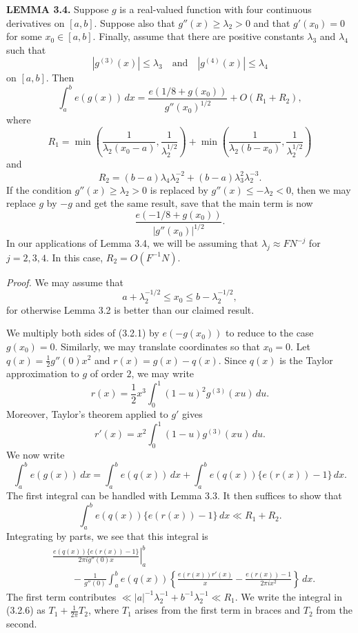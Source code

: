 \documentclass[10pt]{article}
\begin{document}
\medskip
\noindent\textbf{LEMMA 3.4.}
Suppose $g$ is a real-valued function with four continuous derivatives on
$[a,b]$. Suppose also that $g''(x)\geq\lambda_2>0$ and that $g'(x_0)=0$ for
some $x_0\in[a,b]$. Finally, assume that there are positive constants
$\lambda_3$ and $\lambda_4$ such that
\[
 |g^{(3)}(x)|\leq\lambda_3
 \quad\text{and}\quad
 |g^{(4)}(x)|\leq\lambda_4
\]
on $[a,b]$. Then
\begin{equation*}
 \int_a^b e(g(x))\,dx
 =\frac{e(1/8+g(x_0))}{g''(x_0)^{1/2}}+O(R_1+R_2), \tag{3.2.1}
\end{equation*}
where
\[
 R_1=
 \min\left(\frac{1}{\lambda_2(x_0-a)},\frac1{\lambda_2^{1/2}}\right)
 +\min\left(\frac{1}{\lambda_2(b-x_0)},\frac1{\lambda_2^{1/2}}\right)
\]
and
\[
 R_2=(b-a)\lambda_4\lambda_2^{-2}
     +(b-a)\lambda_3^2\lambda_2^{-3}.
\]
If the condition $g''(x)\geq\lambda_2>0$ is replaced by
$g''(x)\leq-\lambda_2<0$, then we may replace $g$ by $-g$ and get the same
result, save that the main term is now
\[
 \frac{e(-1/8+g(x_0))}{|g''(x_0)|^{1/2}}.
\]
In our applications of Lemma 3.4, we will be assuming that
$\lambda_j\approx FN^{-j}$ for $j=2,3,4$. In this case, $R_2=O(F^{-1}N)$.

\noindent\textit{Proof.}
We may assume that
\begin{equation*}
 a+\lambda_2^{-1/2}\leq x_0\leq b-\lambda_2^{-1/2}, \tag{3.2.2}
\end{equation*}
for otherwise Lemma 3.2 is better than our claimed result.

We multiply both sides of (3.2.1) by $e(-g(x_0))$ to reduce to the case
$g(x_0)=0$. Similarly, we may translate coordinates so that $x_0=0$. Let
$q(x)=\tfrac12g''(0)x^2$ and $r(x)=g(x)-q(x)$. Since $q(x)$ is the Taylor
approximation to $g$ of order $2$, we may write
\begin{equation*}
 r(x)=\frac12x^3\int_0^1(1-u)^2g^{(3)}(xu)\,du. \tag{3.2.3}
\end{equation*}
Moreover, Taylor's theorem applied to $g'$ gives
\begin{equation*}
 r'(x)=x^2\int_0^1(1-u)g^{(3)}(xu)\,du. \tag{3.2.4}
\end{equation*}
We now write
\[
 \int_a^b e(g(x))\,dx
 =\int_a^b e(q(x))\,dx
  +\int_a^b e(q(x))\{e(r(x))-1\}\,dx.
\]
The first integral can be handled with Lemma 3.3. It then suffices to show
that
\begin{equation*}
 \int_a^b e(q(x))\{e(r(x))-1\}\,dx\ll R_1+R_2. \tag{3.2.5}
\end{equation*}
Integrating by parts, we see that this integral is
\begin{align*}
 &\left.\frac{e(q(x))\{e(r(x))-1\}}{2\pi i g''(0)x}\right|_a^b \tag{3.2.6}\\
 &\qquad
 -\frac1{g''(0)}\int_a^b e(q(x))
   \left\{\frac{e(r(x))r'(x)}x
   -\frac{e(r(x))-1}{2\pi i x^2}\right\}\,dx.
\end{align*}
The first term contributes
$\ll |a|^{-1}\lambda_2^{-1}+b^{-1}\lambda_2^{-1}\ll R_1$. We write the
integral in (3.2.6) as $T_1+\frac1{2\pi}T_2$, where $T_1$ arises from the
first term in braces and $T_2$ from the second.
\end{document}
